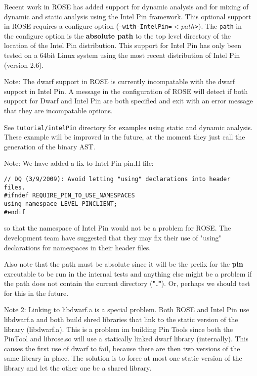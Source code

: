    Recent work in ROSE has added support for dynamic analysis and for mixing of dynamic
and static analysis using the Intel Pin framework. This optional support in ROSE
requires a configure option ({\tt --with-IntelPin=$<path$>}).  The {\tt path} in
the configure option is the {\bf absolute path} to the top level directory of the location of
the Intel Pin distribution.  This support for Intel Pin has only been tested
on a 64bit Linux system using the most recent distribution of Intel Pin (version 2.6).

Note: The dwarf support in ROSE is currently incompatable with the dwarf support in
Intel Pin.  A message in the configuration of ROSE will detect if both support for
Dwarf and Intel Pin are both specified and exit with an error message that they
are incompatable options.

See {\tt tutorial/intelPin} directory for examples using static and dynamic analysis.
These example will be improved in the future, at the moment they just call the
generation of the binary AST.


Note: We have added a fix to Intel Pin pin.H file:
\begin{verbatim}
// DQ (3/9/2009): Avoid letting "using" declarations into header files.
#ifndef REQUIRE_PIN_TO_USE_NAMESPACES
using namespace LEVEL_PINCLIENT;
#endif
\end{verbatim}
so that the namespace of Intel Pin would not be a problem for ROSE.
The development team have suggested that they may fix their use of "using" 
declarations for namespaces in their header files.

Also note that the path must be absolute since it will be the
prefix for the {\bf pin} executable to be run in the internal tests and
anything else might be a problem if the path does not contain the 
current directory ({\bf "."}). Or, perhaps we should test for this
in the future.

Note 2: Linking to libdwarf.a is a special problem.  
Both ROSE and Intel Pin use libdwarf.a and both build shred libraries 
that link to the static version of the library (libdwarf.a).  This is 
a problem im building Pin Tools since both the PinTool and librose.so will use 
a statically linked dwarf library (internally).  This causes the first
use of dwarf to fail, because there are then two versions of the same 
library in place.  The solution is to force at most one static version 
of the library and let the other one be a shared library.

